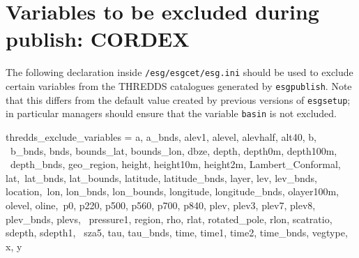 \section{Variables to be excluded during publish: CORDEX}

The following declaration inside \texttt{/esg/esgcet/esg.ini} should be used to exclude certain variables from the THREDDS catalogues generated by \texttt{esgpublish}.  Note that this differs from the default value created by previous versions of \texttt{esgsetup}; in particular managers should ensure that the variable \texttt{basin} is not excluded.

\begin{verbatimtab}[4]
thredds_exclude_variables = a, a_bnds, alev1, alevel, alevhalf, alt40, b, \
b_bnds, bnds, bounds_lat, bounds_lon, dbze, depth, depth0m, depth100m, \
depth_bnds, geo_region, height, height10m, height2m, Lambert_Conformal, lat,\
lat_bnds, lat_bounds, latitude, latitude_bnds, layer, lev, lev_bnds, location,\
lon, lon_bnds, lon_bounds, longitude, longitude_bnds, olayer100m, olevel, oline,\
p0, p220, p500, p560, p700, p840, plev, plev3, plev7, plev8, plev_bnds, plevs, \
pressure1, region, rho, rlat, rotated_pole, rlon, scatratio, sdepth, sdepth1, \
sza5, tau, tau_bnds, time, time1, time2, time_bnds, vegtype, x, y
\end{verbatimtab}

